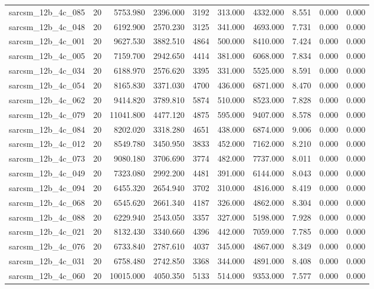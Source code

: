 \begin{tabular}{lrrrrrrrrr}
sarcsm\_12b\_4c\_085 & 20 & 5753.980 & 2396.000 & 3192 & 313.000 & 4332.000 & 8.551 & 0.000 & 0.000 \\
sarcsm\_12b\_4c\_048 & 20 & 6192.900 & 2570.230 & 3125 & 341.000 & 4693.000 & 7.731 & 0.000 & 0.000 \\
sarcsm\_12b\_4c\_001 & 20 & 9627.530 & 3882.510 & 4864 & 500.000 & 8410.000 & 7.424 & 0.000 & 0.000 \\
sarcsm\_12b\_4c\_005 & 20 & 7159.700 & 2942.650 & 4414 & 381.000 & 6068.000 & 7.834 & 0.000 & 0.000 \\
sarcsm\_12b\_4c\_034 & 20 & 6188.970 & 2576.620 & 3395 & 331.000 & 5525.000 & 8.591 & 0.000 & 0.000 \\
sarcsm\_12b\_4c\_054 & 20 & 8165.830 & 3371.030 & 4700 & 436.000 & 6871.000 & 8.470 & 0.000 & 0.000 \\
sarcsm\_12b\_4c\_062 & 20 & 9414.820 & 3789.810 & 5874 & 510.000 & 8523.000 & 7.828 & 0.000 & 0.000 \\
sarcsm\_12b\_4c\_079 & 20 & 11041.800 & 4477.120 & 4875 & 595.000 & 9407.000 & 8.578 & 0.000 & 0.000 \\
sarcsm\_12b\_4c\_084 & 20 & 8202.020 & 3318.280 & 4651 & 438.000 & 6874.000 & 9.006 & 0.000 & 0.000 \\
sarcsm\_12b\_4c\_012 & 20 & 8549.780 & 3450.950 & 3833 & 452.000 & 7162.000 & 8.210 & 0.000 & 0.000 \\
sarcsm\_12b\_4c\_073 & 20 & 9080.180 & 3706.690 & 3774 & 482.000 & 7737.000 & 8.011 & 0.000 & 0.000 \\
sarcsm\_12b\_4c\_049 & 20 & 7323.080 & 2992.200 & 4481 & 391.000 & 6144.000 & 8.043 & 0.000 & 0.000 \\
sarcsm\_12b\_4c\_094 & 20 & 6455.320 & 2654.940 & 3702 & 310.000 & 4816.000 & 8.419 & 0.000 & 0.000 \\
sarcsm\_12b\_4c\_068 & 20 & 6545.620 & 2661.340 & 4187 & 326.000 & 4862.000 & 8.304 & 0.000 & 0.000 \\
sarcsm\_12b\_4c\_088 & 20 & 6229.940 & 2543.050 & 3357 & 327.000 & 5198.000 & 7.928 & 0.000 & 0.000 \\
sarcsm\_12b\_4c\_021 & 20 & 8132.430 & 3340.660 & 4396 & 442.000 & 7059.000 & 7.785 & 0.000 & 0.000 \\
sarcsm\_12b\_4c\_076 & 20 & 6733.840 & 2787.610 & 4037 & 345.000 & 4867.000 & 8.349 & 0.000 & 0.000 \\
sarcsm\_12b\_4c\_031 & 20 & 6758.480 & 2742.850 & 3368 & 344.000 & 4891.000 & 8.408 & 0.000 & 0.000 \\
sarcsm\_12b\_4c\_060 & 20 & 10015.000 & 4050.350 & 5133 & 514.000 & 9353.000 & 7.577 & 0.000 & 0.000 \\

\end{tabular}
